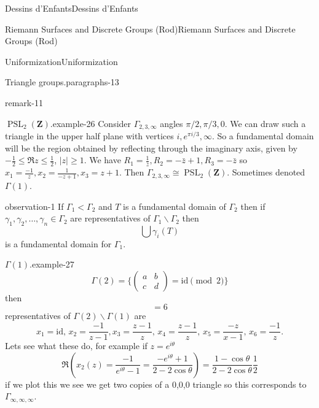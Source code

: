 \documentclass[10pt,]{book}
\numberwithin{equation}{section}
\newcommand{\ZZ}{\mathbf{Z}}
\newcommand{\id}{\mathrm{id}}
\DeclareMathOperator{\PSL}{PSL}
\newcommand{\lt}{<}
\newcommand{\amp}{&}
\begin{document}
\begin{chapterptx}{Dessins d'Enfants}{}{Dessins d'Enfants}{}{}
\begin{sectionptx}{Riemann Surfaces and Discrete Groups (Rod)}{}{Riemann Surfaces and Discrete Groups (Rod)}{}{}
\begin{subsectionptx}{Uniformization}{}{Uniformization}{}{}
\begin{paragraphs}{Triangle groups.}{paragraphs-13}
\begin{remark}{}{remark-11}
\end{remark}
\begin{example}{\(\PSL_2(\ZZ)\).}{example-26}%
\hypertarget{p-560}{}%
Consider \(\Gamma_{2,3,\infty}\) angles \(\pi/2, \pi/3, 0\). We can draw such a triangle in the upper half plane with vertices \(i, e^{\pi i/3}, \infty\). So a fundamental domain will be the region obtained by reflecting through the imaginary axis, given by \(-\frac 12 \le \Re z \le \frac 12\), \(|z| \ge 1\). We have \(R_1 = \frac{1}{\bar z}, R_2 = -\bar z +1,R_3 = -\bar z\) so \(x_1 = \frac{-1}{z}, x_2 = \frac{1}{-z+1}, x_3 = z+1\). Then \(\Gamma_{2,3,\infty} \cong \PSL_2(\ZZ)\). Sometimes denoted \(\Gamma(1)\).%
\end{example}
\begin{observation}{}{observation-1}%
\hypertarget{p-561}{}%
If \(\Gamma_1 \lt \Gamma_2\) and \(T\) is a fundamental domain of \(\Gamma_2\) then if \(\gamma_1, \gamma_2, \ldots, \gamma_n \in \Gamma_2\) are representatives of \(\Gamma_1\backslash \Gamma_2\) then%
\begin{equation*}
\bigcup \gamma_i (T)
\end{equation*}
is a fundamental domain for \(\Gamma_1\).%
\end{observation}
\begin{example}{\(\Gamma(1)\).}{example-27}%
\hypertarget{p-562}{}%
%
\begin{equation*}
\Gamma(2) = \{\begin{pmatrix} a\amp b \\ c\amp d\end{pmatrix} = \id \pmod 2 \}
\end{equation*}
then%
\begin{equation*}
[\Gamma(1) : \Gamma(2)] = 6
\end{equation*}
representatives of \(\Gamma(2) \backslash \Gamma(1)\) are%
\begin{equation*}
x_1 = \id,\,x_2 = \frac{-1}{z-1}, x_3 = \frac{z-1}{z},\, x_4 = \frac{z-1}{z},\,x_5 = \frac{-z}{x-1},\,x_6 = \frac{-1}{z}\text{.}
\end{equation*}
Lets see what these do, for example if \(z= e^{i\theta}\)%
\begin{equation*}
\Re(x_2(z) = \frac{-1}{e^{i\theta} - 1} = \frac{-e^{i\theta} + 1}{2- 2\cos \theta}) = \frac{1-\cos \theta}{ 2- 2\cos \theta} \frac 12
\end{equation*}
if we plot this we see we get two copies of a 0,0,0 triangle so this corresponds to \(\Gamma_{\infty,\infty,\infty}\).%
\begin{equation*}

\end{equation*}
\end{example}
\end{paragraphs}
\end{subsectionptx}
\end{sectionptx}
\end{chapterptx}
\end{document}
